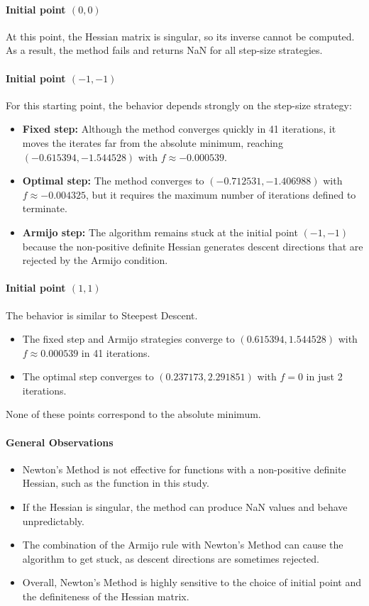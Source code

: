 \documentclass[11pt]{article}
\begin{document}
\paragraph{Initial point $(0,0)$}  
At this point, the Hessian matrix is singular, so its inverse cannot be computed. As a result, the method fails and returns NaN for all step-size strategies.

\paragraph{Initial point $(-1,-1)$}  
For this starting point, the behavior depends strongly on the step-size strategy:
\begin{itemize}
    \item \textbf{Fixed step:} Although the method converges quickly in 41 iterations, it moves the iterates far from the absolute minimum, reaching $(-0.615394, -1.544528)$ with $f \approx -0.000539$.
    \item \textbf{Optimal step:} The method converges to $(-0.712531, -1.406988)$ with $f \approx -0.004325$, but it requires the maximum number of iterations defined to terminate.
    \item \textbf{Armijo step:} The algorithm remains stuck at the initial point $(-1,-1)$ because the non-positive definite Hessian generates descent directions that are rejected by the Armijo condition.
\end{itemize}

\paragraph{Initial point $(1,1)$}  
The behavior is similar to Steepest Descent.  
\begin{itemize}
    \item The fixed step and Armijo strategies converge to $(0.615394, 1.544528)$ with $f \approx 0.000539$ in 41 iterations.  
    \item The optimal step converges to $(0.237173, 2.291851)$ with $f = 0$ in just 2 iterations.  
\end{itemize}  
None of these points correspond to the absolute minimum.

\paragraph{General Observations}  
\begin{itemize}
    \item Newton's Method is not effective for functions with a non-positive definite Hessian, such as the function in this study.  
    \item If the Hessian is singular, the method can produce NaN values and behave unpredictably.  
    \item The combination of the Armijo rule with Newton's Method can cause the algorithm to get stuck, as descent directions are sometimes rejected.  
    \item Overall, Newton's Method is highly sensitive to the choice of initial point and the definiteness of the Hessian matrix.
\end{itemize}
\end{document}
